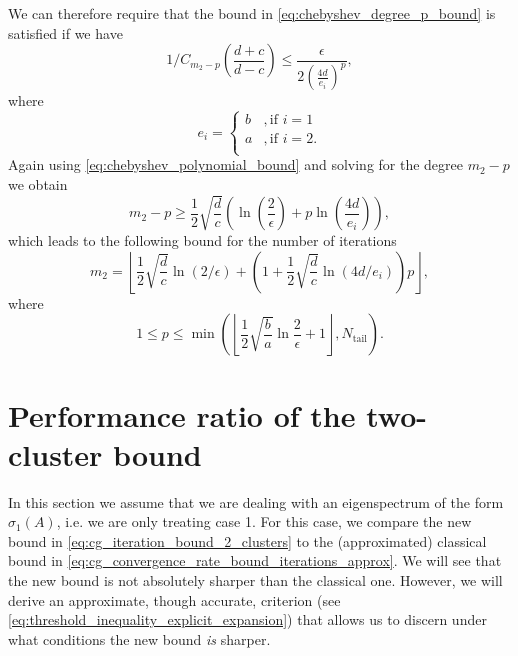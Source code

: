 We can therefore require that the bound in \cref{eq:chebyshev_degree_p_bound} is satisfied if we have
\[
    1/C_{m_2-p}\left(\frac{d+c}{d-c}\right) \leq \frac{\epsilon}{2\left( \frac{4d}{e_i}\right)^p},
\]
where 
\[
    e_i = \begin{cases}
        b &, \text{if } i = 1\\
        a &, \text{if } i = 2.\\
    \end{cases}
\]
Again using \cref{eq:chebyshev_polynomial_bound} and solving for the degree $m_2 - p$ we obtain
\[
    m_2 - p \geq \frac{1}{2}\sqrt{\frac{d}{c}}\left(\ln\left(\frac{2}{\epsilon}\right) + p \ln\left(\frac{4d}{e_i}\right)\right),
\]
which leads to the following bound for the number of iterations \cite[Equation 4.4]{cg_sharpened_convrate_Axelsson1976}
\begin{equation}
    m_2=\left\lfloor\frac{1}{2} \sqrt{\frac{d}{c}} \ln (2 / \epsilon)+\left(1+\frac{1}{2} \sqrt{\frac{d}{c}} \ln (4 d / e_i)\right) p\right\rfloor,
    \label{eq:cg_iteration_bound_2_clusters}
\end{equation}
where 
\[
    1 \leq p \leq \min\left(\left\lfloor\frac{1}{2}\sqrt{\frac{b}{a}}\ln{\frac{2}{\epsilon}} + 1 \right\rfloor, N_{\text{tail}}\right).
\]

\section{Performance ratio of the two-cluster bound}\label{sec:performance_ratio}
In this section we assume that we are dealing with an eigenspectrum of the form $\sigma_1(A)$, i.e. we are only treating case 1. For this case, we compare the new bound in \cref{eq:cg_iteration_bound_2_clusters} to the (approximated) classical bound in \cref{eq:cg_convergence_rate_bound_iterations_approx}. We will see that the new bound is not absolutely sharper than the classical one. However, we will derive an approximate, though accurate, criterion (see \cref{eq:threshold_inequality_explicit_expansion}) that allows us to discern under what conditions the new bound \textit{is} sharper.

